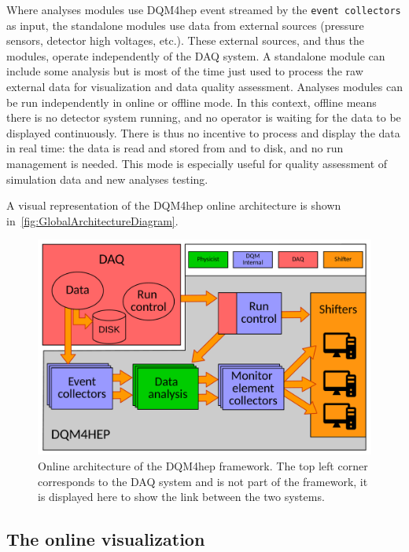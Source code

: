 \documentclass{webofc}
\begin{document}
Where analyses modules use DQM4hep event streamed by the \texttt{event collectors} as input, the standalone modules use data from external sources (pressure sensors, detector high voltages, etc.).
These external sources, and thus the modules, operate independently of the DAQ system.
A standalone module can include some analysis but is most of the time just used to process the raw external data for visualization and data quality assessment.
Analyses modules can be run independently in online or offline mode.
In this context, offline means there is no detector system running, and no operator is waiting for the data to be displayed continuously.
There is thus no incentive to process and display the data in real time: the data is read and stored from and to disk, and no run management is needed.
This mode is especially useful for quality assessment of simulation data and new analyses testing.


A visual representation of the DQM4hep online architecture is shown in~\autoref{fig:GlobalArchitectureDiagram}.

\begin{figure}
  \centering
  \includegraphics[width=.95\textwidth]{figs/AnalysisModuleArchitecture.pdf}
  \caption{Online architecture of the DQM4hep framework. The top left corner corresponds to the DAQ system and is not part
  of the framework, it is displayed here to show the link between the two systems.}
  \label{fig:GlobalArchitectureDiagram}
\end{figure}


\subsection{The online visualization}
\label{subsec:vis}
\end{document}
